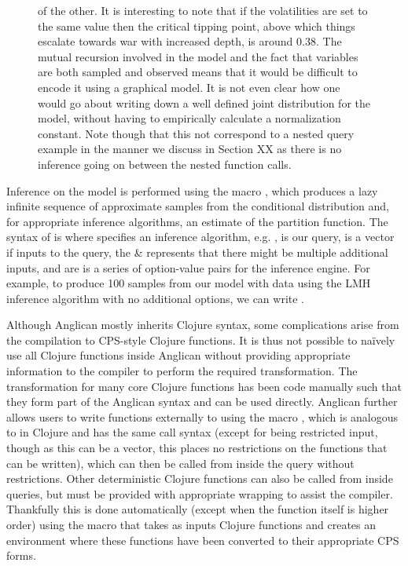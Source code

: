 \begin{figure}[p]
{of the other.  It is interesting to note that if the volatilities are set to the same value then
the critical tipping point, above which things escalate towards war with increased depth, is around $0.38$.
The mutual recursion involved in the model and the fact that variables are both sampled and 
observed means that it would be difficult to encode it using a graphical model.  It is not even clear how
one would go about writing down a well defined joint distribution for the model, without having to empirically
calculate a normalization constant.  Note though that this not correspond to a nested query example in the
manner we discuss in Section XX as there is no inference going on between the nested function calls.
\label{fig:probprog:schell}
		}
\end{figure}

Inference on the model is performed using the macro \doquery, which produces a lazy infinite sequence of 
approximate samples from the conditional distribution and, for appropriate inference algorithms,
an estimate of the partition function.
The syntax of \doquery is {\small {}} where {\small {}}
specifies an inference algorithm, e.g. {\small {}}, {\small {}} is our query, {\small {}}
is a vector if inputs to the query, the \& represents that there might be multiple additional inputs, and {\small {}}
are is a series of option-value pairs for the inference engine.  For example, to produce 100 samples from
our {\small {}} model with data {\small \lsi{[2.1 5.2 1.1]}} using the LMH inference algorithm with no
additional options, we can write {\small {}}.

Although Anglican mostly inherits Clojure syntax, some complications arise from the compilation to
CPS-style Clojure functions.  It is thus not possible to na\"{i}vely use all Clojure functions inside Anglican
without providing appropriate information to the compiler to perform the required transformation.
The transformation for many core Clojure functions has been code manually such that they form
part of the Anglican syntax and can be used directly.  Anglican further allows users to write functions externally
to  using the macro , which is analogous to  in Clojure and has the same call syntax (except
for being restricted input, though as this can be a vector, this places no restrictions on the functions that can be
written), which can then be called from inside the query without restrictions.  Other deterministic Clojure functions can also
be called from inside queries, but must be provided with appropriate wrapping to assist the compiler.  Thankfully
this is done automatically (except when the function itself is higher order) using the macro
{\small {}} that takes as inputs Clojure functions and creates an environment where
these functions have been converted to their appropriate CPS forms.

